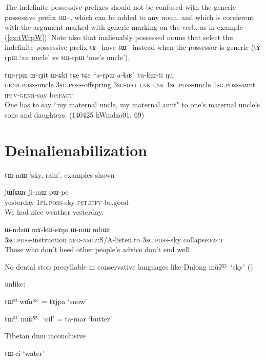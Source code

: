\documentclass[oldfontcommands,oneside,a4paper,11pt]{article}
\newcommand{\ipa}[1]{{\phon #1}} %
\newcommand{\refb}[1]{(\ref{#1})}
\begin{document}
 
The indefinite possessive prefixes should not be confused with the generic possessive prefix \ipa{tɯ--}, which can be added to any noun, and which is coreferent with the argument marked with generic marking on the verb, as in example \refb{ex:tWrpW}. Note also that inalienably possessed nouns that select the indefinite possessive prefix \ipa{tɤ--} have \ipa{tɯ--} instead when the possessor is generic (\ipa{tɤ-rpɯ} `an uncle' vs \ipa{tɯ-rpɯ} `one's uncle').

\begin{exe}
\ex \label{ex:tWrpW}
\gll
 \ipa{tɯ-rpɯ} 	\ipa{ɯ-rɟit} 	\ipa{ɯ-ɕki} 	\ipa{tɕe} 	\ipa{tɕe} 	``\ipa{a-rpɯ} \ipa{a-ɬaʁ}" 	\ipa{tu-kɯ-ti} 	\ipa{ŋu.} \\
\textsc{genr.poss}-uncle \textsc{3sg.poss}-offspring \textsc{3sg-dat} \textsc{lnk} \textsc{lnk} \textsc{1sg.poss}-uncle \textsc{1sg.poss}-aunt \textsc{ipfv-genr}-say  be:\textsc{fact} \\
\glt One has to say ``my maternal uncle, my maternal aunt" to one's maternal uncle's sons and daughters. (140425 kWmdza01, 69)
\end{exe}

 
\section{Deinalienabilization}

\ipa{tɯ-mɯ} `sky, rain', examples shown

\begin{exe}
\ex 
\gll
\ipa{jɯfɕɯr} 	\ipa{ji-mɯ} 	\ipa{pɯ-pe} \\
yesterday \textsc{1pl.poss}-sky \textsc{pst.ipfv}-be.good \\
\glt We had nice weather yesterday.
\end{exe}

\begin{exe}
\ex 
\gll
\ipa{ɯ-ndzɯ} 	\ipa{mɤ-kɯ-sɤŋo} 	\ipa{ɯ-mɯ} 	\ipa{mbɯt} \\
\textsc{3sg.poss}-instruction \textsc{neg-nmlz}:S/A-listen.to \textsc{3sg.poss}-sky collapse:\textsc{fact} \\
\glt Those who don't heed other people's advice don't end well.
\end{exe}


No dental stop presyllable in conservative languages like Dulong \ipa{mŭʔ⁵⁵ } `sky' (\citealt[207]{sunhk82dulong})


unlike:

 \ipa{tɯ³¹ wɑ̆n⁵³ } = \ipa{tɤjpa} `snow'
 
 \ipa{tɯ³¹ mɑ̆ɹ⁵⁵  } `oil' = \ipa{ta-mar} `butter' 
 
Tibetan \ipa{dmu} inconclusive

\ipa{tɯ-ci} `water'

 
 



\end{document}
